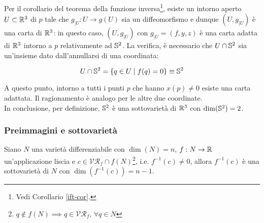 Per il corollario del teorema della funzione inversa\footnote{%
	Vedi Corollario \ref{ift-cor}.%
}, esiste un intorno aperto $ U \subset \R^{3} $ di $ p $ tale che $ g_{|U} : U \to g(U) $ sia un diffeomorfismo e dunque $ (U,g_{|U}) $ è una carta di $ \R^{3} $: in questo caso, $ (U,g_{|U}) $ con $ g_{|U} = (f,y,z) $ è una carta adatta di $ \R^{3} $ intorno a $ p $ relativamente ad $ \S^{2} $. La verifica, è necessario che $ U \cap \S^{2} $ sia un'insieme dato dall'annullarsi di una coordinata:

\begin{equation}
	U \cap \S^{2} = \{ q \in U \mid f(q) = 0 \} \equiv \S^{2}
\end{equation}

A questo punto, intorno a tutti i punti $ p $ che hanno $ x(p) \neq 0 $ esiste una carta adattata. Il ragionamento è analogo per le altre due coordinate.\\
In conclusione, per definizione, $ \S^{2}$ è una sottovarietà di $\R^{3} $ con $ \dim(\S^{2})=2 $.

\subsubsection{Preimmagini e sottovarietà}

\begin{theorem}[Preimmagine di un valore regolare (caso $ M = \R $)]
	Siano $ N $ una varietà differenziabile con $ \dim(N)=n $, $ f : N \to \R $ un'applicazione liscia e $ c \in \mathcal{VR}_{f} \cap f(N) $\footnote{%
		$ q \notin f(N) \implies q \in \mathcal{VR}_{f}, \, \forall q \in N $%
	}, i.e. $ f^{-1}(c) \neq 0 $, allora $ f^{-1}(c) $ è una sottovarietà di $ N $ con $ \dim(f^{-1}(c)) = n-1 $.
\end{theorem}

